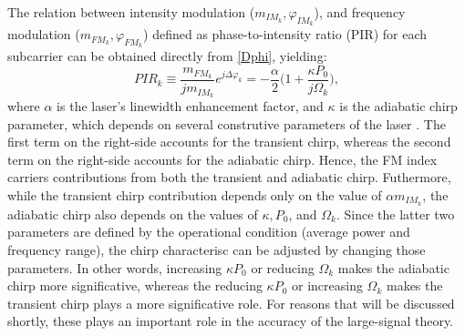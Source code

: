 \documentclass[journal]{IEEEtran}
\begin{document}
The relation between intensity modulation ($m_{IM_k}, \varphi_{IM_k}$), and frequency modulation ($m_{FM_k}, \varphi_{FM_k}$) defined as phase-to-intensity ratio (PIR) \cite{eva} for each subcarrier can be obtained directly from \eqref{Dphi}, yielding:
\begin{equation} \label{PIRk}
PIR_k \equiv \frac{m_{FM_k}}{jm_{IM_k}}e^{j\Delta\varphi_k} = -\frac{\alpha}{2}\bigg(1 + \frac{\kappa P_0}{j\Omega_k}\bigg),
\end{equation}
where $\alpha$ is the laser's linewidth enhancement factor, and $\kappa$ is the adiabatic chirp parameter, which depends on several construtive parameters of the laser \cite{corvini}. The first term on the right-side accounts for the transient chirp, whereas the second term on the right-side accounts for the adiabatic chirp. Hence, the FM index carriers contributions from both the transient and adiabatic chirp. Futhermore, while the transient chirp contribution depends only on the value of $\alpha m_{IM_k}$, the adiabatic chirp also depends on the values of $\kappa, P_0$, and $\Omega_k$. Since the latter two parameters are defined by the operational condition (average power and frequency range), the chirp characterisc can be adjusted by changing those parameters. In other words, increasing $\kappa P_0$ or reducing $\Omega_k$ makes the adiabatic chirp more significative, whereas the reducing $\kappa P_0$ or increasing $\Omega_k$ makes the transient chirp plays a more significative role. For reasons that will be discussed shortly, these plays an important role in the accuracy of the large-signal theory.
\end{document}
